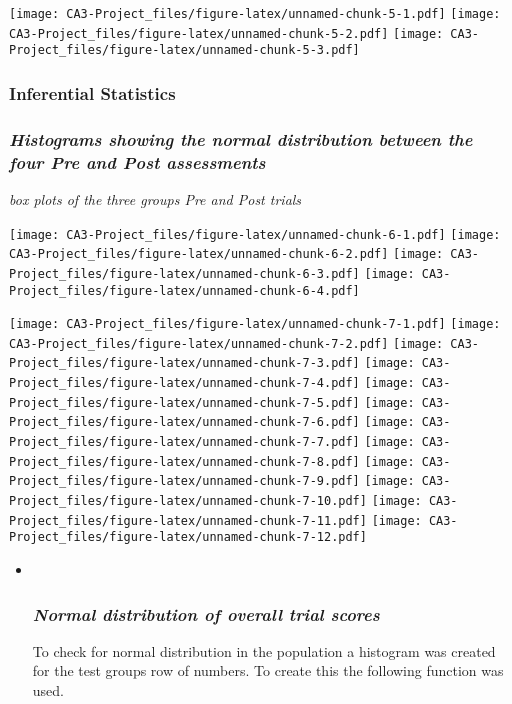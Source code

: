 \documentclass[
]{article}
\begin{document}
\texttt{[image: CA3-Project\_files/figure-latex/unnamed-chunk-5-1.pdf]}
\texttt{[image: CA3-Project\_files/figure-latex/unnamed-chunk-5-2.pdf]}
\texttt{[image: CA3-Project\_files/figure-latex/unnamed-chunk-5-3.pdf]}

\hypertarget{inferential-statistics}{%
\subsubsection{\texorpdfstring{\textbf{Inferential
Statistics}}{Inferential Statistics}}\label{inferential-statistics}}

\hypertarget{histograms-showing-the-normal-distribution-between-the-four-pre-and-post-assessments}{%
\subsubsection{\texorpdfstring{\emph{Histograms showing the normal
distribution between the four Pre and Post
assessments}}{Histograms showing the normal distribution between the four Pre and Post assessments}}\label{histograms-showing-the-normal-distribution-between-the-four-pre-and-post-assessments}}

\emph{box plots of the } \emph{three groups Pre and Post trials}

\texttt{[image: CA3-Project\_files/figure-latex/unnamed-chunk-6-1.pdf]}
\texttt{[image: CA3-Project\_files/figure-latex/unnamed-chunk-6-2.pdf]}
\texttt{[image: CA3-Project\_files/figure-latex/unnamed-chunk-6-3.pdf]}
\texttt{[image: CA3-Project\_files/figure-latex/unnamed-chunk-6-4.pdf]}

\texttt{[image: CA3-Project\_files/figure-latex/unnamed-chunk-7-1.pdf]}
\texttt{[image: CA3-Project\_files/figure-latex/unnamed-chunk-7-2.pdf]}
\texttt{[image: CA3-Project\_files/figure-latex/unnamed-chunk-7-3.pdf]}
\texttt{[image: CA3-Project\_files/figure-latex/unnamed-chunk-7-4.pdf]}
\texttt{[image: CA3-Project\_files/figure-latex/unnamed-chunk-7-5.pdf]}
\texttt{[image: CA3-Project\_files/figure-latex/unnamed-chunk-7-6.pdf]}
\texttt{[image: CA3-Project\_files/figure-latex/unnamed-chunk-7-7.pdf]}
\texttt{[image: CA3-Project\_files/figure-latex/unnamed-chunk-7-8.pdf]}
\texttt{[image: CA3-Project\_files/figure-latex/unnamed-chunk-7-9.pdf]}
\texttt{[image: CA3-Project\_files/figure-latex/unnamed-chunk-7-10.pdf]}
\texttt{[image: CA3-Project\_files/figure-latex/unnamed-chunk-7-11.pdf]}
\texttt{[image: CA3-Project\_files/figure-latex/unnamed-chunk-7-12.pdf]}

\begin{itemize}
\item ~
  \hypertarget{normal-distribution-of-overall-trial-scores}{%
  \subsubsection{\texorpdfstring{\emph{Normal distribution of overall
  trial
  scores}}{Normal distribution of overall trial scores}}\label{normal-distribution-of-overall-trial-scores}}

  To check for normal distribution in the population a histogram was
  created for the test groups row of numbers. To create this the
  following function was used.
\end{itemize}
\end{document}
